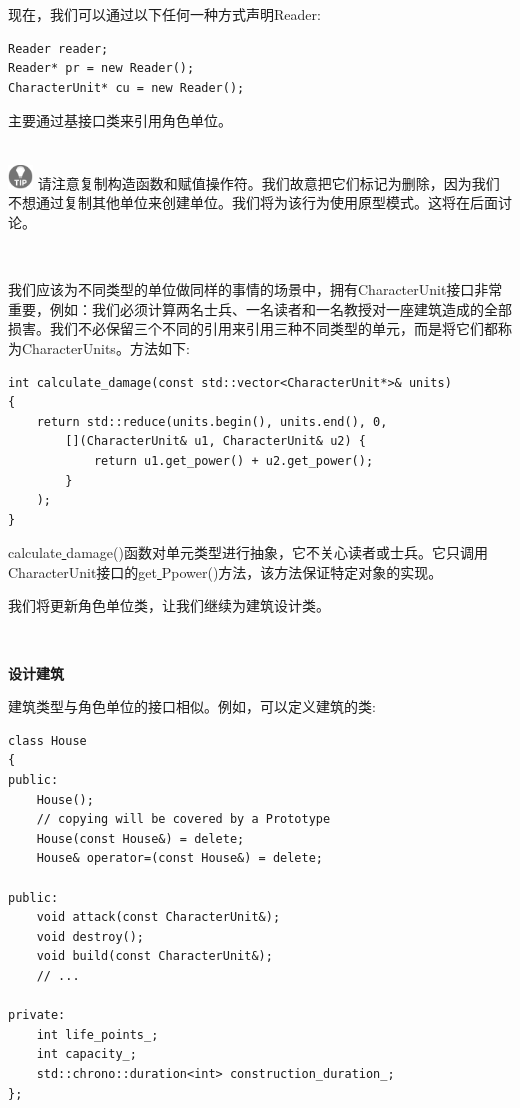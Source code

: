 现在，我们可以通过以下任何一种方式声明Reader: \par

\begin{lstlisting}[caption={}]
Reader reader;
Reader* pr = new Reader();
CharacterUnit* cu = new Reader();
\end{lstlisting}

主要通过基接口类来引用角色单位。 \par

\hspace*{\fill} \\ %
\includegraphics[width=0.05\textwidth]{images/tip}
请注意复制构造函数和赋值操作符。我们故意把它们标记为删除，因为我们不想通过复制其他单位来创建单位。我们将为该行为使用原型模式。这将在后面讨论。 \par
\noindent\textbf{}\ \par

我们应该为不同类型的单位做同样的事情的场景中，拥有CharacterUnit接口非常重要，例如：我们必须计算两名士兵、一名读者和一名教授对一座建筑造成的全部损害。我们不必保留三个不同的引用来引用三种不同类型的单元，而是将它们都称为CharacterUnits。方法如下: \par

\begin{lstlisting}[caption={}]
int calculate_damage(const std::vector<CharacterUnit*>& units)
{
	return std::reduce(units.begin(), units.end(), 0,
		[](CharacterUnit& u1, CharacterUnit& u2) {
			return u1.get_power() + u2.get_power();
		}
	);
}
\end{lstlisting}

calculate\underline{ }damage()函数对单元类型进行抽象，它不关心读者或士兵。它只调用CharacterUnit接口的get\underline{ }Ppower()方法，该方法保证特定对象的实现。\par
我们将更新角色单位类，让我们继续为建筑设计类。 \par

\noindent\textbf{}\ \par
\textbf{设计建筑} \ \par
建筑类型与角色单位的接口相似。例如，可以定义建筑的类: \par

\begin{lstlisting}[caption={}]
class House
{
public:
	House();
	// copying will be covered by a Prototype
	House(const House&) = delete;
	House& operator=(const House&) = delete;
	
public:
	void attack(const CharacterUnit&);
	void destroy();
	void build(const CharacterUnit&);
	// ...
	
private:
	int life_points_;
	int capacity_;
	std::chrono::duration<int> construction_duration_;
};
\end{lstlisting}

